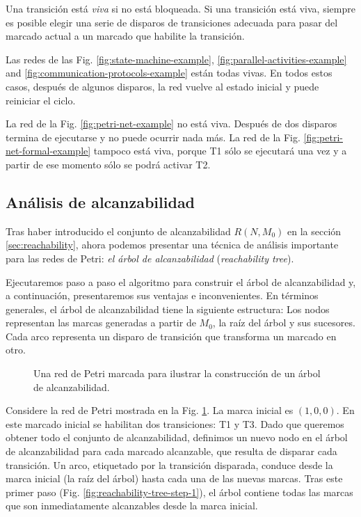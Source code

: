 Una transición está \emph{viva} si no está bloqueada.
Si una transición está viva, siempre es posible
elegir una serie de disparos de transiciones adecuada
para pasar del marcado actual a un marcado que habilite la transición.

Las redes de las Fig. \ref{fig:state-machine-example}, \ref{fig:parallel-activities-example}
and \ref{fig:communication-protocols-example} están todas vivas.
En todos estos casos, después de algunos disparos,
la red vuelve al estado inicial y puede reiniciar el ciclo.

La red de la Fig. \ref{fig:petri-net-example} no está viva.
Después de dos disparos termina de ejecutarse y no puede
ocurrir nada más.
La red de la Fig. \ref{fig:petri-net-formal-example} tampoco está viva,
porque T1 sólo se ejecutará una vez y a partir de ese momento sólo se podrá activar T2.

\subsection{Análisis de alcanzabilidad}

Tras haber introducido el conjunto de alcanzabilidad $R(N, M_0)$ en la sección \ref{sec:reachability},
ahora podemos presentar una técnica de análisis importante para las redes de Petri: \emph{el árbol de
      alcanzabilidad} (\textit{reachability tree}).

Ejecutaremos paso a paso el algoritmo para construir el árbol de alcanzabilidad y, a
continuación, presentaremos sus ventajas e inconvenientes. En términos generales, el árbol de
alcanzabilidad tiene la siguiente estructura: Los nodos representan las marcas generadas a partir
de $M_0$, la raíz del árbol y sus sucesores.
Cada arco representa un disparo de transición que transforma un marcado en otro.

\begin{figure}[!htb]
      \centering
      
      \caption{Una red de Petri marcada para ilustrar la construcción de un árbol de alcanzabilidad.}
      \label{fig:reachability-tree-example}
\end{figure}

Considere la red de Petri mostrada en la Fig. \ref{fig:reachability-tree-example}.
La marca inicial es $(1, 0, 0)$.
En este marcado inicial se habilitan dos transiciones: T1 y T3.
Dado que queremos obtener todo el conjunto de alcanzabilidad,
definimos un nuevo nodo en el árbol de alcanzabilidad para cada
marcado alcanzable, que resulta de disparar cada transición. Un arco, etiquetado por la
transición disparada, conduce desde la marca inicial (la raíz del árbol) hasta cada una de las
nuevas marcas. Tras este primer paso (Fig. \ref{fig:reachability-tree-step-1}),
el árbol contiene todas las marcas que son inmediatamente alcanzables desde la marca inicial.

